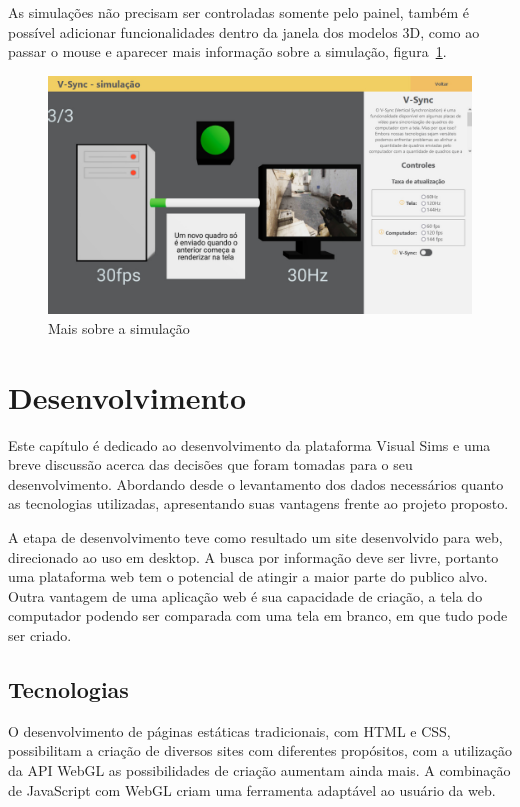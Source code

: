 \documentclass[tcc,capa]{texufpel}
\begin{document}
As simulações não precisam ser controladas somente pelo painel, também é possível adicionar funcionalidades dentro da janela dos modelos 3D, como ao passar o mouse e aparecer mais informação sobre a simulação, figura~\ref{simulacao_extra}. 

\begin{figure}[htbp]
  \centering \includegraphics[scale=.2]{Navegacao/pagina_simulacao_extra.jpeg}
  \caption{Mais sobre a simulação}
  \label{simulacao_extra}
\end{figure}

\chapter{Desenvolvimento}
\label{cap: desenvolvimento}

Este capítulo é dedicado ao desenvolvimento da plataforma Visual Sims e uma breve discussão acerca das decisões que foram tomadas para o seu desenvolvimento. Abordando desde o levantamento dos dados necessários quanto as tecnologias utilizadas, apresentando suas vantagens frente ao projeto proposto.

A etapa de desenvolvimento teve como resultado um site desenvolvido para web, direcionado ao uso em desktop. A busca por informação deve ser livre, portanto uma plataforma web tem o potencial de atingir a maior parte do publico alvo. Outra vantagem de uma aplicação web é sua capacidade de criação, a tela do computador podendo ser comparada com uma tela em branco, em que tudo pode ser criado.

\section{Tecnologias}

O desenvolvimento de páginas estáticas tradicionais, com HTML e CSS, possibilitam a criação de diversos sites com diferentes propósitos, com a utilização da API WebGL as possibilidades de criação aumentam ainda mais. A combinação de JavaScript com WebGL criam uma ferramenta adaptável ao usuário da web.
\end{document}
